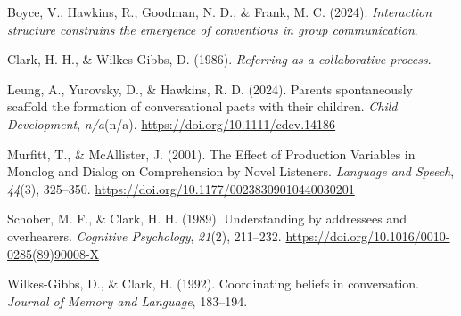\documentclass[10pt, letterpaper]{article}
\begin{document}
\label{refs}
\begin{CSLReferences}{1}{0}
Boyce, V., Hawkins, R., Goodman, N. D., \& Frank, M. C. (2024).
\emph{Interaction structure constrains the emergence of conventions in
group communication}.

Clark, H. H., \& Wilkes-Gibbs, D. (1986). \emph{Referring as a
collaborative process}.

Leung, A., Yurovsky, D., \& Hawkins, R. D. (2024). Parents spontaneously
scaffold the formation of conversational pacts with their children.
\emph{Child Development}, \emph{n/a}(n/a).
\url{https://doi.org/10.1111/cdev.14186}

Murfitt, T., \& McAllister, J. (2001). The {Effect} of {Production
Variables} in {Monolog} and {Dialog} on {Comprehension} by {Novel
Listeners}. \emph{Language and Speech}, \emph{44}(3), 325--350.
\url{https://doi.org/10.1177/00238309010440030201}

Schober, M. F., \& Clark, H. H. (1989). Understanding by addressees and
overhearers. \emph{Cognitive Psychology}, \emph{21}(2), 211--232.
\url{https://doi.org/10.1016/0010-0285(89)90008-X}

Wilkes-Gibbs, D., \& Clark, H. (1992). Coordinating beliefs in
conversation. \emph{Journal of Memory and Language}, 183--194.

\end{CSLReferences}


\end{document}
